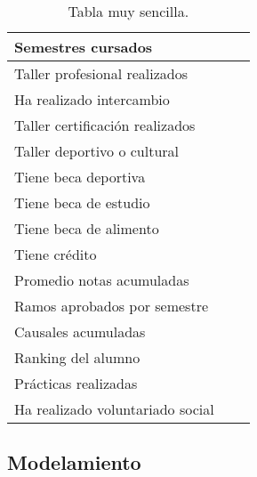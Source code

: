 \begin{table}[H]
\begin{center}
\begin{tabular}{|l|l|l|}
			Semestres cursados & & \\ \hline
			Taller profesional realizados & & \\ \hline
			Ha realizado intercambio & & \\ \hline
			Taller certificación realizados & & \\ \hline
			Taller deportivo o cultural & & \\ \hline
			Tiene beca deportiva & & \\ \hline
			Tiene beca de estudio &  & \\ \hline
			Tiene beca de alimento & & \\ \hline
			Tiene crédito &  & \\ \hline
			Promedio notas acumuladas &  & \\ \hline
			Ramos aprobados por semestre & & \\ \hline
			Causales acumuladas & & \\ \hline
			Ranking del alumno & & \\ \hline
			Prácticas realizadas & & \\ \hline
			Ha realizado voluntariado social & & \\ \hline
			
		\end{tabular}
		\caption{Tabla muy sencilla.}
		\label{tabla:sencilla}
	\end{center}
\end{table}


\subsection{Modelamiento}
